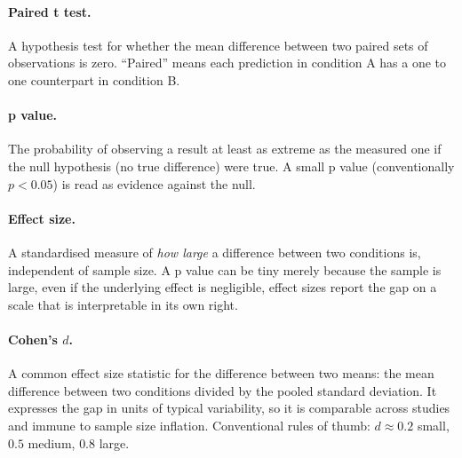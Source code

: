 \paragraph{Paired t test.} A hypothesis test for whether the mean difference between two paired sets of observations is zero. ``Paired'' means each prediction in condition A has a one to one counterpart in condition B.

\paragraph{p value.} The probability of observing a result at least as extreme as the measured one if the null hypothesis (no true difference) were true. A small p value (conventionally $p < 0.05$) is read as evidence against the null.

\paragraph{Effect size.} A standardised measure of \emph{how large} a difference between two conditions is, independent of sample size. A p value can be tiny merely because the sample is large, even if the underlying effect is negligible, effect sizes report the gap on a scale that is interpretable in its own right.

\paragraph{Cohen's $d$.} A common effect size statistic for the difference between two means: the mean difference between two conditions divided by the pooled standard deviation. It expresses the gap in units of typical variability, so it is comparable across studies and immune to sample size inflation. Conventional rules of thumb: $d \approx 0.2$ small, $0.5$ medium, $0.8$ large.